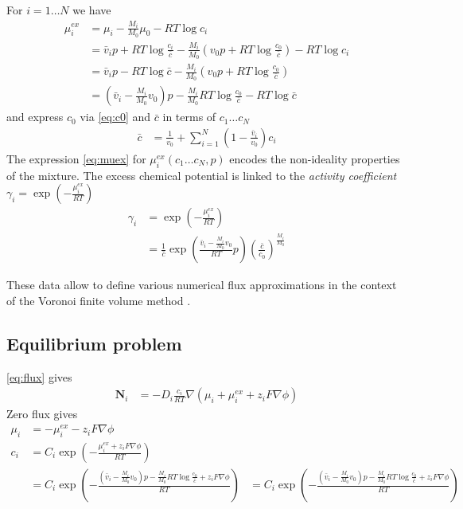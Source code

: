 \documentclass[12pt,oneside,reqno]{amsart}
\numberwithin{equation}{section}
\begin{document}
For $i=1\dots N$ we have
\begin{align}
  \mu_i^{ex} &= \mu_i - \frac{M_i}{M_0} \mu_0  - RT \log c_i\nonumber\\
             &= \bar v_ip +  RT \log \frac{c_i}{\bar c}  -\frac{M_i}{M_0}\left(  v_0p + RT \log \frac{c_0}{\bar c}\right)  - RT \log c_i  \nonumber\\
            &= \bar v_ip - RT\log \bar c - \frac{M_i}{M_0}\left(v_0p + RT \log \frac{c_0}{\bar c}\right)\nonumber\\
            &= \left(\bar v_i-\frac{M_i}{M_0}v_0\right)p - \frac{M_i}{M_0}RT\log \frac{c_0}{\bar c} - RT\log \bar c \label{eq:muex}
\end{align}
and express $c_0$ via \eqref{eq:c0} and $\bar c$ in terms of $c_1\dots c_N$
\begin{align*}
  \bar c &%
          = \frac{1}{v_0} + \sum_{i=1}^N \left(1- \frac{\bar v_i}{v_0}\right) c_i 
\end{align*}
The expression \eqref{eq:muex} for $\mu_i^{ex}(c_1\dots c_N, p)$  encodes the non-ideality properties of the mixture.
The excess chemical potential is linked to the \textit{activity coefficient} $\gamma_i=\exp(-\frac{\mu_i^{ex}}{RT})$
\cite{Fuhrmann2015}
\begin{align*}
  \gamma_i&=\exp(-\frac{\mu_i^{ex}}{RT})\\
         &= \frac{1}{\bar c}\exp\left(\frac{\bar v_i-\frac{M_i}{M_0}v_0}{RT}p\right)\left(\frac{\bar c}{c_0}\right)^{\frac{M_i}{M_0}}
\end{align*}




These data allow to define various numerical flux approximations in the context of the Voronoi finite volume
method \cite{Fuhrmann2015,GaudeulFuhrmannNM2022}.


\subsection{Equilibrium problem}
\eqref{eq:flux} gives
\begin{align}\label{eq:fluxx}
  \mathbf N_i &= - D_i\frac{c_i}{RT}\nabla\left( \mu_i +  \mu_i^{ex} + z_i F \nabla \phi \right)
\end{align}
Zero flux gives 
\begin{align}
  \mu_i   &=   - \mu_i^{ex} - z_i F \nabla \phi\\
  c_i   &=  C_i\exp\left( -\frac{\mu_i^{ex} + z_i F \nabla \phi}{RT}\right)\\
        &=  C_i \exp\left(-\frac{\left(\bar v_i-\frac{M_i}{M_0}v_0\right)p - \frac{M_i}{M_0}RT\log \frac{c_0}{\bar c} + z_i F \nabla \phi}{RT}\right)
        &=  C_i \exp\left(-\frac{\left(\bar v_i-\frac{M_i}{M_0}v_0\right)p - \frac{M_i}{M_0}RT\log \frac{c_0}{\bar c} + z_i F \nabla \phi}{RT}\right)
\end{align}
\end{document}

